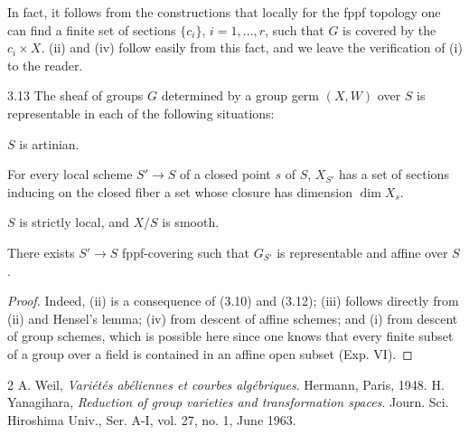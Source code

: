 In fact, it follows
from the constructions
that locally for the
fppf topology one
can find a finite
set of sections
\(\{c_i\}\), \(i=1,\ldots,r\),
such that \(G\) is
covered by the
\(c_i\times X\).
(ii) and (iv)
follow easily from
this fact, and we
leave the verification
of (i) to the reader.
\begin{corollary}{3.13}\label{XVIII.3.13}
The sheaf of
groups \(G\)
determined by a
group germ \((X,W)\)
over \(S\) is
representable in each
of the following situations:
\begin{enumeratei}
\item \(S\) is artinian.
\item For every local
scheme \(S'\to S\)
of a closed point
\(s\) of \(S\),
\(X_{S'}\) has a
set of sections
inducing on the
closed fiber a set
whose closure has
dimension \(\dim X_s\).
\item \(S\) is strictly
local, and \(X/S\)
is smooth.
\item There exists
\(S'\to S\)
fppf-covering such
that \(G_{S'}\)
is representable
and affine over \(S\).
\end{enumeratei}
\end{corollary}
\begin{proof}
Indeed, (ii) is
a consequence of
(3.10) and (3.12);
(iii) follows
directly from (ii)
and \og Hensel's lemma\fg;
(iv) from descent
of affine schemes;
and (i) from
descent of group
schemes, which is
possible here since
one knows that every
finite subset of a
group over a field
is contained in an
affine open subset
(Exp. VI).
\end{proof}

\begin{thebibliography}{2}
A. Weil, \emph{Variétés abéliennes et courbes algébriques}.
Hermann, Paris, 1948.
H. Yanagihara, \emph{Reduction of group varieties and transformation spaces}.
Journ. Sci. Hiroshima Univ., Ser. A-I, vol. 27, no. 1, June 1963.
\end{thebibliography}

